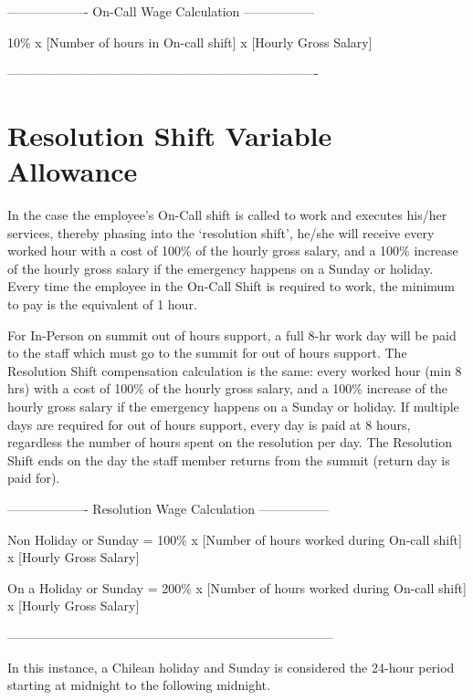 \begin{center} -------------------  On-Call Wage Calculation ----------------- \end{center}
10\% x [Number of hours in On-call shift] x [Hourly Gross Salary]
\begin{center} ------------------------------------------------------------------------- \end{center}


\section{Resolution Shift Variable Allowance}

In the case the employee's On-Call shift is called to work and executes his/her services, thereby phasing into the `resolution shift', he/she will receive every worked hour with a cost of 100\% of the hourly gross salary, and a 100\% increase of the hourly gross salary if the emergency happens on a Sunday or holiday. Every time the employee in the On-Call Shift is required to work, the minimum to pay is the equivalent of 1 hour.

For In-Person on summit out of hours support, a full 8-hr work day will be paid to the staff which must go to the summit for out of hours support.  The Resolution Shift compensation calculation is the same:  every worked hour (min 8 hrs) with a cost of 100\% of the hourly gross salary, and a 100\% increase of the hourly gross salary if the emergency happens on a Sunday or holiday.  If multiple days are required for out of hours support, every day is paid at 8 hours, regardless the number of hours spent on the resolution per day.  The Resolution Shift ends on the day the staff member returns from the summit (return day is paid for).

\begin{center} -------------------  Resolution Wage Calculation ----------------- \end{center}
Non Holiday or Sunday = 100\% x [Number of hours worked during On-call shift] x [Hourly Gross Salary]

\par
On a Holiday or Sunday = 200\% x [Number of hours worked during On-call shift] x [Hourly Gross Salary]
\begin{center} ----------------------------------------------------------------------------- \end{center}


In this instance, a Chilean holiday and Sunday is considered the 24-hour period starting at midnight to the following midnight.

